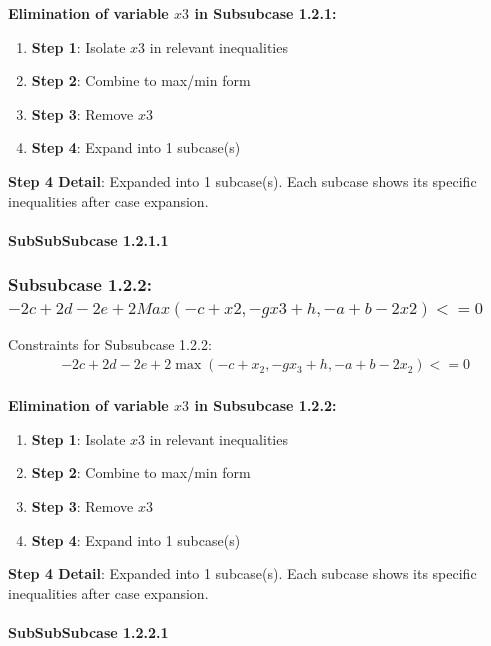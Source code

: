 \documentclass{article}
\begin{document}
\textbf{Elimination of variable $x3$ in Subsubcase 1.2.1:}

\begin{enumerate}
\item \textbf{Step 1}: Isolate $x3$ in relevant inequalities
\item \textbf{Step 2}: Combine to max/min form
\item \textbf{Step 3}: Remove $x3$
\item \textbf{Step 4}: Expand into 1 subcase(s)
\end{enumerate}

\textbf{Step 4 Detail}: Expanded into 1 subcase(s).
Each subcase shows its specific inequalities after case expansion.

\paragraph{SubSubSubcase 1.2.1.1}

\subsubsection{Subsubcase 1.2.2: $-2 c + 2 d - 2 e + 2 Max(-c + x2, -g x3 + h, -a + b - 2 x2) <= 0$}

Constraints for Subsubcase 1.2.2:
\begin{align}
& - 2 c + 2 d - 2 e + 2 \max\left(- c + x_{2}, - g x_{3} + h, - a + b - 2 x_{2}\right) <= 0 \\
\end{align}

\textbf{Elimination of variable $x3$ in Subsubcase 1.2.2:}

\begin{enumerate}
\item \textbf{Step 1}: Isolate $x3$ in relevant inequalities
\item \textbf{Step 2}: Combine to max/min form
\item \textbf{Step 3}: Remove $x3$
\item \textbf{Step 4}: Expand into 1 subcase(s)
\end{enumerate}

\textbf{Step 4 Detail}: Expanded into 1 subcase(s).
Each subcase shows its specific inequalities after case expansion.

\paragraph{SubSubSubcase 1.2.2.1}
\end{document}
